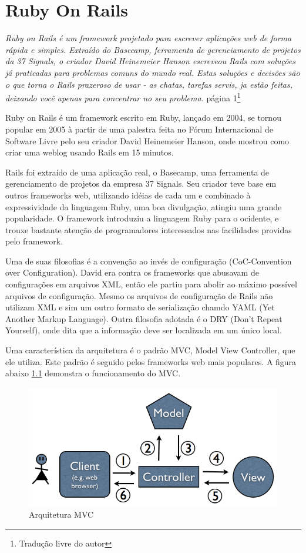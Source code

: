 \chapter{Ruby On Rails}

\emph{Ruby on Rails é um framework projetado para escrever aplicações web de forma rápida e simples. Extraído do Basecamp, ferramenta de gerenciamento de projetos da 37 Signals, o criador David Heinemeier Hanson escreveou Rails com soluções já praticadas para problemas comuns do mundo real. Estas soluções e decisões são o que torna o Rails prazeroso de usar - as chatas, tarefas servis, ja estão feitas, deixando você apenas para concentrar no seu problema.}
\cite{rails_in_nutshell}{página 1}\footnote{Tradução livre do autor}

Ruby on Rails é um framework escrito em Ruby, lançado em 2004, se tornou popular em 2005 à partir de uma palestra feita no Fórum Internacional de Software Livre pelo seu criador David Heinemeier Hanson, onde mostrou como criar uma weblog usando Rails em 15 minutos. 

Rails foi extraído de uma aplicação real, o Basecamp, uma ferramenta de gerenciamento de projetos da empresa 37 Signals. Seu criador teve base em outros frameworks web, utilizando idéias de cada um e combinado à expressividade da linguagem Ruby, uma boa divulgação, atingiu uma grande popularidade. O framework introduziu a linguagem Ruby para o ocidente, e trouxe bastante atenção de programadores interessados nas facilidades providas pelo framework.

Uma de suas filosofias é a convenção ao invés de configuração (CoC-Convention over Configuration). David era contra os frameworks que abusavam de configurações em arquivos XML, então ele partiu para abolir ao máximo possível arquivos de configuração. Mesmo os arquivos de configuração de Rails não utilizam XML e sim um outro formato de serialização chamdo YAML (Yet Another Markup Language). Outra filosofia adotada é o DRY (Don't Repeat Yourself), onde dita que a informação deve ser localizada em um único local.     

Uma característica da arquitetura é o padrão MVC, Model View Controller, que ele utiliza. Este padrão é seguido pelos frameworks web mais populares. A figura abaixo \ref{fig:mvc-diagram} demonstra o funcionamento do MVC.

\begin{figure}[here]
\includegraphics[width=150mm]{images/mvc-diagram.png}
\caption{Arquitetura MVC}
\label{fig:mvc-diagram}
\end{figure}

